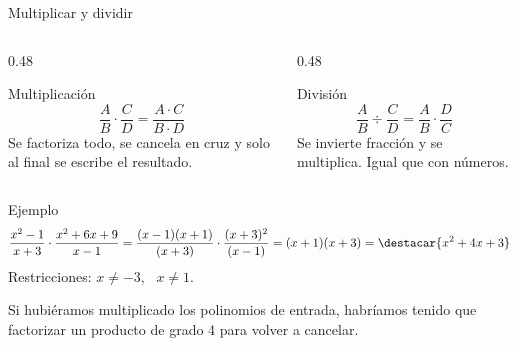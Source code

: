 \documentclass[aspectratio=169,10pt]{beamer}
\begin{document}
\begin{frame}{Multiplicar y dividir}
  \scriptsize
  \begin{columns}[T,onlytextwidth]
    \begin{column}{0.48\textwidth}
      \begin{block}{Multiplicación}
        \tiny
        \[ \frac{A}{B}\cdot\frac{C}{D} = \frac{A\cdot C}{B\cdot D} \]
         Se factoriza todo, se
        cancela en cruz y solo al final se escribe el resultado.
      \end{block}
    \end{column}
    \begin{column}{0.48\textwidth}
      \begin{block}{División}
        \tiny
        \[ \frac{A}{B}\div\frac{C}{D}
           = \frac{A}{B}\cdot\frac{D}{C} \]
        Se invierte  fracción y se multiplica. Igual que con
        números.
      \end{block}
    \end{column}
  \end{columns}

  \vspace{0.12cm}
  \begin{exampleblock}{Ejemplo}
    \tiny
    \[ \frac{x^{2}-1}{x+3}\cdot\frac{x^{2}+6x+9}{x-1}
     = \frac{(x-1)(x+1)}{(x+3)}\cdot\frac{(x+3)^{2}}{(x-1)}
     = (x+1)(x+3) = \destacar{x^{2}+4x+3} \]
    Restricciones: $x\neq -3$, \ $x\neq 1$.
  \end{exampleblock}

  \vspace{0.06cm}
  {\tiny\color{uniGris} Si hubiéramos multiplicado los polinomios de entrada,
  habríamos tenido que factorizar un producto de grado 4 para volver a
  cancelar. }
\end{frame}
\end{document}
